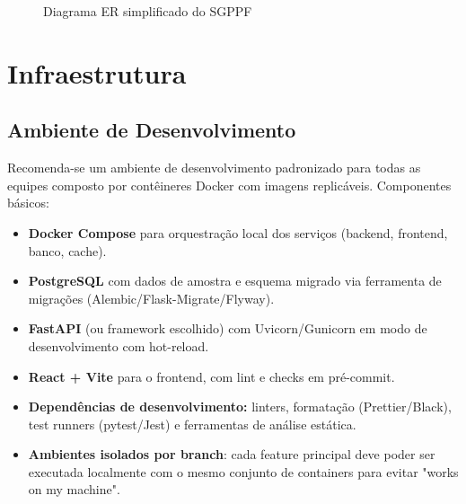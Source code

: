 \documentclass[12pt,a4paper]{article}
\begin{document}
\begin{landscape}
\begin{figure}[p]
\caption{Diagrama ER simplificado do SGPPF}
\end{figure}
\end{landscape}
\clearpage

\section{Infraestrutura}
\subsection{Ambiente de Desenvolvimento}
Recomenda-se um ambiente de desenvolvimento padronizado para todas as equipes composto por contêineres Docker com imagens replicáveis. Componentes básicos:
\begin{itemize}[leftmargin=*]
  \item \textbf{Docker Compose} para orquestração local dos serviços (backend, frontend, banco, cache).
  \item \textbf{PostgreSQL} com dados de amostra e esquema migrado via ferramenta de migrações (Alembic/Flask-Migrate/Flyway).
  \item \textbf{FastAPI} (ou framework escolhido) com Uvicorn/Gunicorn em modo de desenvolvimento com hot-reload.
  \item \textbf{React + Vite} para o frontend, com lint e checks em pré-commit.
  \item \textbf{Dependências de desenvolvimento:} linters, formatação (Prettier/Black), test runners (pytest/Jest) e ferramentas de análise estática.
  \item \textbf{Ambientes isolados por branch}: cada feature principal deve poder ser executada localmente com o mesmo conjunto de containers para evitar "works on my machine".
\end{itemize}
\end{document}

